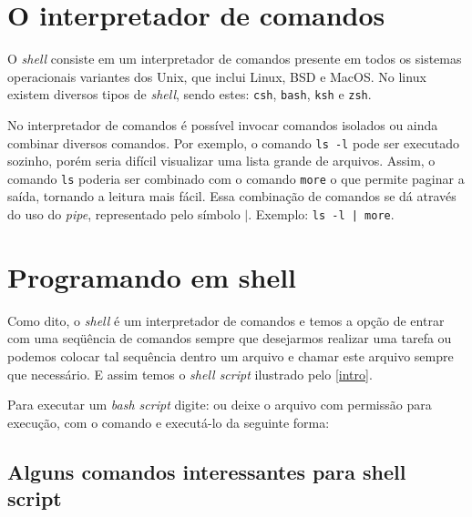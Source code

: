 \documentclass[11pt]{../classes/ifscarticle}
\begin{document}

\shell

\section{O interpretador de comandos}

O \textit{shell} consiste em um interpretador de comandos presente em todos os sistemas operacionais variantes dos Unix, que inclui Linux, BSD e MacOS. No linux existem diversos tipos de \textit{shell}, sendo estes: \texttt{csh}, \texttt{bash}, \texttt{ksh} e \texttt{zsh}. 

No interpretador de comandos é possível invocar comandos isolados ou ainda combinar diversos comandos. Por exemplo, o comando \texttt{ls -l} pode ser executado sozinho, porém seria difícil visualizar uma lista grande de arquivos. Assim, o comando \texttt{ls} poderia ser combinado com o comando \texttt{more} o que permite paginar a saída, tornando a leitura mais fácil. Essa combinação de comandos se dá através do uso do \textit{pipe}, representado pelo símbolo $|$. Exemplo: \texttt{ls -l | more}.

\section{Programando em shell}

Como dito, o \textit{shell} é um interpretador de comandos e temos a opção de entrar com uma seqüência de comandos sempre que desejarmos realizar uma tarefa ou podemos colocar tal sequência dentro um arquivo e chamar este arquivo sempre que necessário. E assim temos o \textit{shell script} ilustrado pelo \autoref{intro}.


\begin{informacao}
	Para executar um \textit{bash script} digite:  ou deixe o arquivo com permissão para execução, com o comando  e executá-lo da seguinte forma: 
\end{informacao}

\subsection{Alguns comandos interessantes para shell script}
\end{document}
